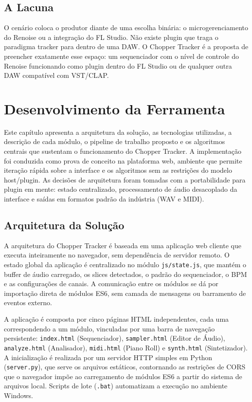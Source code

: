 \documentclass[portuguese]{sbc2025}
\begin{document}
\subsection{A Lacuna}

O cenário coloca o produtor diante de uma escolha binária: o microgerenciamento do Renoise ou a integração do FL Studio. Não existe plugin que traga o paradigma tracker para dentro de uma DAW. O Chopper Tracker é a proposta de preencher exatamente esse espaço: um sequenciador com o nível de controle do Renoise funcionando como plugin dentro do FL Studio ou de qualquer outra DAW compatível com VST/CLAP.


\section{Desenvolvimento da Ferramenta}

Este capítulo apresenta a arquitetura da solução, as tecnologias utilizadas, a descrição de cada módulo, o pipeline de trabalho proposto e os algoritmos centrais que sustentam o funcionamento do Chopper Tracker. A implementação foi conduzida como prova de conceito na plataforma web, ambiente que permite iteração rápida sobre a interface e os algoritmos sem as restrições do modelo host/plugin. As decisões de arquitetura foram tomadas com a portabilidade para plugin em mente: estado centralizado, processamento de áudio desacoplado da interface e saídas em formatos padrão da indústria (WAV e MIDI).

\subsection{Arquitetura da Solução}

A arquitetura do Chopper Tracker é baseada em uma aplicação web cliente que executa inteiramente no navegador, sem dependência de servidor remoto. O estado global da aplicação é centralizado no módulo \texttt{js/state.js}, que mantém o buffer de áudio carregado, os slices detectados, o padrão do sequenciador, o BPM e as configurações de canais. A comunicação entre os módulos se dá por importação direta de módulos ES6, sem camada de mensagens ou barramento de eventos externo.

A aplicação é composta por cinco páginas HTML independentes, cada uma correspondendo a um módulo, vinculadas por uma barra de navegação persistente: \texttt{index.html} (Sequenciador), \texttt{sampler.html} (Editor de Áudio), \texttt{analyze.html} (Analisador), \texttt{midi.html} (Piano Roll) e \texttt{synth.html} (Sintetizador). A inicialização é realizada por um servidor HTTP simples em Python (\texttt{server.py}), que serve os arquivos estáticos, contornando as restrições de CORS que o navegador impõe ao carregamento de módulos ES6 a partir do sistema de arquivos local. Scripts de lote (\texttt{.bat}) automatizam a execução no ambiente Windows.
\end{document}
